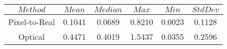 \begin{table}[h]
\centering
\begin{tabular}{|c|c|c|c|c|c|}
\hline
$Method$ & $Mean$ & $Median$ & $Max$ & $Min$ & $StdDev$ \\
\hline
Pixel-to-Real & 0.1041 & 0.0689 & 0.8210 & 0.0023 & 0.1128 \\
\hline
Optical & 0.4471 & 0.4019 & 1.5437 & 0.0355 & 0.2596 \\
\hline
\end{tabular}
\end{table}
